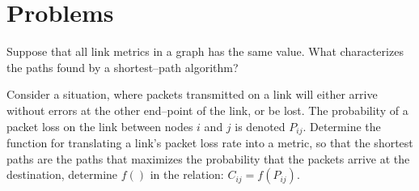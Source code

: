 \clearpage
\section{Problems}

\begin{problem}{1}
Suppose that all link metrics in a graph has the same value. What
characterizes the paths found by a shortest--path algorithm?
\end{problem}

\begin{problem}{2}
Consider a situation, where packets transmitted on a link will
either arrive without errors at the other end--point of the link,
or be lost. The probability of a packet loss on the link between
nodes $i$ and $j$ is denoted $P_{ij}$. Determine the function for
translating a link's packet loss rate into a metric, so that the
shortest paths are the paths that maximizes the probability that
the packets arrive at the destination, \ie determine $f()$ in the
relation: $C_{ij} = f(P_{ij})$.
\end{problem}
